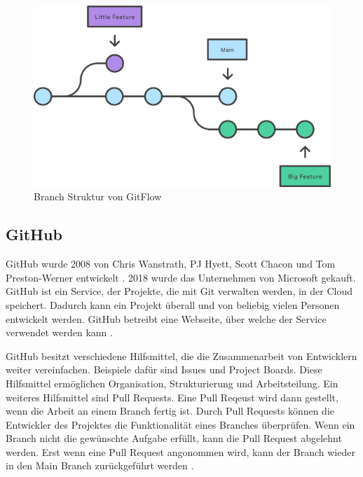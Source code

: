 \begin{figure}[!ht]
    \centering
    \includegraphics[width=\textwidth-2cm]{images/theorie/git-branch.png}
    \caption{Branch Struktur von GitFlow \cite{atlassian_git-flow-workflow_nodate}}
    \label{fig:git-branch}
\end{figure}

\subsection{GitHub}\label{sub:t_git_gh}
GitHub wurde 2008 von Chris Wanstrath, PJ Hyett, Scott Chacon und Tom
Preston-Werner entwickelt \cite{noauthor_github_2021}. 2018 wurde das
Unternehmen von Microsoft gekauft. GitHub ist ein Service, der Projekte, die mit
Git verwalten werden, in der Cloud speichert. Dadurch kann ein Projekt überall
und von beliebig vielen Personen entwickelt werden. GitHub betreibt eine
Webseite, über welche der Service verwendet werden kann
\cite{noauthor_github_2021}.

GitHub besitzt verschiedene Hilfsmittel, die die Zusammenarbeit von Entwicklern
weiter vereinfachen. Beispiele dafür sind Issues und Project Boards. Diese
Hilfsmittel ermöglichen Organisation, Strukturierung und Arbeitsteilung. Ein
weiteres Hilfsmittel sind Pull Requests. Eine Pull Reqeust wird dann gestellt,
wenn die Arbeit an einem Branch fertig ist. Durch Pull Requests können die
Entwickler des Projektes die Funktionalität eines Branches überprüfen. Wenn ein
Branch nicht die gewünschte Aufgabe erfüllt, kann die Pull Request abgelehnt
werden. Erst wenn eine Pull Request angonommen wird, kann der Branch wieder in
den Main Branch zurückgeführt werden \cite{atlassian_pull_nodate}.

